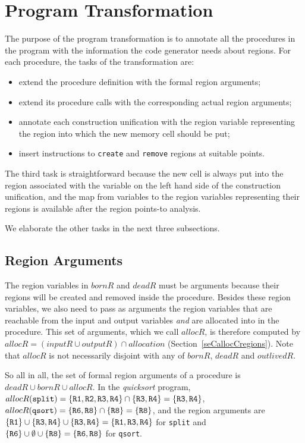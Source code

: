 \documentclass{tlp}
\newcommand{\allocR}[1]{\ensuremath{{allocR}(#1)}}
\def\bornRegs{\mathit{bornR}}
\def\deadRegs{\mathit{deadR}}
\def\inputRegs{\mathit{inputR}}
\def\outputRegs{\mathit{outputR}}
\def\allocRegs{\mathit{allocR}}
\def\outlivedRegs{\mathit{outlivedR}}
\def\allocationRegs{\mathit{allocation}}
\newcommand{\code}[1]{{\tt#1}}
\begin{document}
\section{Program Transformation}
\label{seCpt}

The purpose of the program transformation is
to annotate all the procedures in the program
with the information the code generator needs about regions.
For each procedure, the tasks of the transformation are:
\begin{itemize}
    \item extend the procedure definition with the formal region arguments;
    \item extend its procedure calls
        with the corresponding actual region arguments;
    \item annotate each construction unification with the region variable
        representing the region into which the new memory cell should be put;
    \item insert instructions to \code{create} and \code{remove} regions
        at suitable points.
\end{itemize}
The third task is straightforward
because the new cell is always put into the region associated with
the variable on the left hand side of the construction unification,
and the map from variables to the region variables representing their regions
is available after the region points-to analysis.

We elaborate the other tasks in the next three subsections.

\subsection{Region Arguments}

The region variables in $\bornRegs$ and $\deadRegs$ must be arguments
because their regions will be created and removed inside the procedure.
Besides these region variables,
we also need to pass as arguments
the region variables that are reachable from the input and output variables
\emph{and} are allocated into in the procedure.
This set of arguments, which we call $\allocRegs$,
is therefore computed by
$\allocRegs = (\inputRegs \cup \outputRegs) \cap \allocationRegs$
(Section~\ref{seCallocCregions}).
Note that $\allocRegs$ is not necessarily disjoint
with any of $\bornRegs$, $\deadRegs$ and $\outlivedRegs$.

So all in all, the set of formal region arguments of a procedure
is $\deadRegs \cup \bornRegs \cup \allocRegs$.
In the \emph{quicksort} program,
$\allocR{\code{split}} = \{\code{R1},\code{R2},\code{R3},\code{R4}\}
\cap \{\code{R3}, \code{R4}\} = \{\code{R3}, \code{R4}\}$,
$\allocR{\code{qsort}} = \{\code{R6}, \code{R8}\} \cap \{\code{R8}\} =
\{\code{R8}\}$,
and the region arguments are
$\{\code{R1}\} \cup \{\code{R3}, \code{R4}\} \cup \{\code{R3},
\code{R4}\} = \{\code{R1}, \code{R3}, \code{R4}\}$ for \code{split}
and $\{\code{R6}\} \cup \emptyset \cup \{\code{R8}\} =
\{\code{R6}, \code{R8}\}$ for \code{qsort}.
\end{document}
